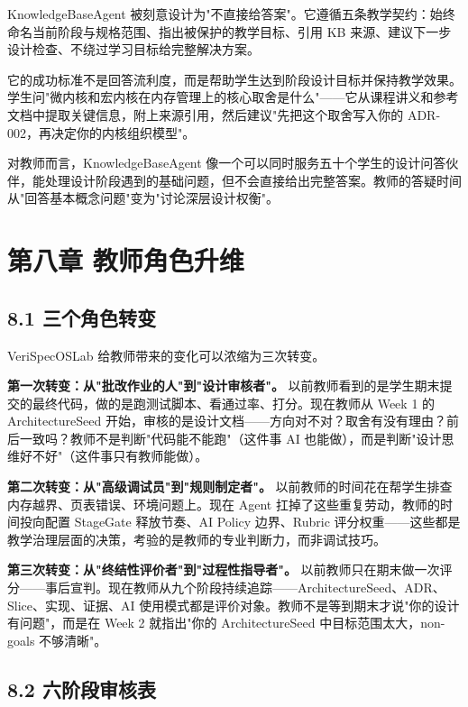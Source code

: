 \documentclass[UTF8,a4paper,12pt,openany]{ctexrep}
\begin{document}
KnowledgeBaseAgent 被刻意设计为"不直接给答案"。它遵循五条教学契约：始终命名当前阶段与规格范围、指出被保护的教学目标、引用 KB 来源、建议下一步设计检查、不绕过学习目标给完整解决方案。

它的成功标准不是回答流利度，而是帮助学生达到阶段设计目标并保持教学效果。学生问"微内核和宏内核在内存管理上的核心取舍是什么"------它从课程讲义和参考文档中提取关键信息，附上来源引用，然后建议"先把这个取舍写入你的 ADR-002，再决定你的内核组织模型"。

对教师而言，KnowledgeBaseAgent 像一个可以同时服务五十个学生的设计问答伙伴，能处理设计阶段遇到的基础问题，但不会直接给出完整答案。教师的答疑时间从"回答基本概念问题"变为"讨论深层设计权衡"。


\chapter{第八章 教师角色升维}\label{ux7b2cux516bux7ae0-ux6559ux5e08ux89d2ux8272ux5347ux7ef4}

\section{8.1 三个角色转变}\label{81-ux4e09ux4e2aux89d2ux8272ux8f6cux53d8}

VeriSpecOSLab 给教师带来的变化可以浓缩为三次转变。

\textbf{第一次转变：从"批改作业的人"到"设计审核者"。} 以前教师看到的是学生期末提交的最终代码，做的是跑测试脚本、看通过率、打分。现在教师从 Week 1 的 ArchitectureSeed 开始，审核的是设计文档------方向对不对？取舍有没有理由？前后一致吗？教师不是判断"代码能不能跑"（这件事 AI 也能做），而是判断"设计思维好不好"（这件事只有教师能做）。

\textbf{第二次转变：从"高级调试员"到"规则制定者"。} 以前教师的时间花在帮学生排查内存越界、页表错误、环境问题上。现在 Agent 扛掉了这些重复劳动，教师的时间投向配置 StageGate 释放节奏、AI Policy 边界、Rubric 评分权重------这些都是教学治理层面的决策，考验的是教师的专业判断力，而非调试技巧。

\textbf{第三次转变：从"终结性评价者"到"过程性指导者"。} 以前教师只在期末做一次评分------事后宣判。现在教师从九个阶段持续追踪------ArchitectureSeed、ADR、Slice、实现、证据、AI 使用模式都是评价对象。教师不是等到期末才说"你的设计有问题"，而是在 Week 2 就指出"你的 ArchitectureSeed 中目标范围太大，non-goals 不够清晰"。

\section{8.2 六阶段审核表}\label{82-ux516dux9636ux6bb5ux5ba1ux6838ux8868}
\end{document}
